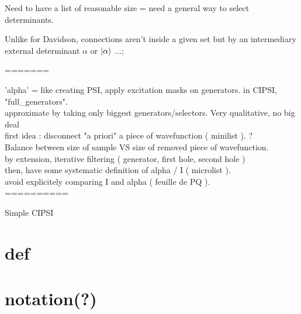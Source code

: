 \documentclass[./thesis.tex]{subfiles}
\begin{document}
Need to have a list of reasonable size = need a general way to select determinants. 

Unlike for Davidson, connections aren't inside a given set but by an intermediary external determinant $\alpha$ or $\ket \alpha$ ...; 

=======

'alpha' = like creating PSI, apply excitation masks on generators. in CIPSI, "full\_generators". \\
approximate by taking only biggest generators/selectors. Very qualitative, no big deal \\
first idea : disconnect "a priori" a piece of wavefunction ( minilist ). ?\\
Balance between size of sample VS size of removed piece of wavefunction. \\
by extension, iterative filtering ( generator, first hole, second hole ) \\
then, have some systematic definition of alpha / I ( microlist ). \\
avoid explicitely comparing I and alpha ( feuille de PQ ). \\

==========



\begin{algorithm}
	\caption{Simple CIPSI}
		\KwData{ $\Psi$ }
\end{algorithm}

\section{def}

\section{notation(?)}
\end{document}
